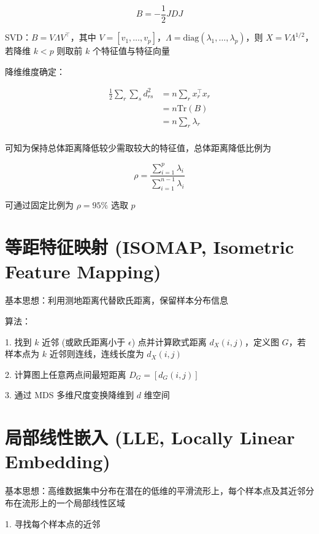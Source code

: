 \documentclass[openany,a4paper,12pt]{ctexbook}
\theoremstyle{kaiti}
\theoremstyle{normal}
\begin{document}
\begin{equation}
B=-\frac{1}{2}JDJ
\end{equation}

SVD：$B=V\Lambda V^{\top}$，其中 $V=\left[v_1,\dots ,v_p \right]$，$\Lambda =\mathrm{diag}\left(\lambda_1,\dots ,\lambda_p \right)$，则 $X=V\Lambda ^{1/2}$，若降维 $k < p$ 则取前 $k$ 个特征值与特征向量

降维维度确定：

\begin{equation}
\begin{aligned}
  \frac{1}{2}\sum_r\sum_sd_{rs}^{2}
  &=n\sum_rx_{r}^{\top}x_r\\
  &=n\mathrm{Tr}\left(B \right)\\
  &=n\sum_r\lambda_r\\
\end{aligned}
\end{equation}

可知为保持总体距离降低较少需取较大的特征值，总体距离降低比例为 

\begin{equation}
\rho=\frac{\displaystyle\sum_{i=1}^{p}\lambda_i}{\displaystyle\sum_{i=1}^{n-1}\lambda_i}
\end{equation}

可通过固定比例为 $\rho=95\%$ 选取 $p$

\section{等距特征映射 (ISOMAP, Isometric Feature Mapping) }

基本思想：利用测地距离代替欧氏距离，保留样本分布信息

算法：

1. 找到 $k$ 近邻 (或欧氏距离小于 $\epsilon$) 点并计算欧式距离 $d_X\left(i,j \right)$，定义图 $G$，若样本点为 $k$ 近邻则连线，连线长度为 $d_X\left(i,j \right)$

2. 计算图上任意两点间最短距离 $D_G=\left[d_G\left(i,j \right)\right]$

3. 通过 MDS 多维尺度变换降维到 $d$ 维空间

\section{局部线性嵌入 (LLE, Locally Linear Embedding) }

基本思想：高维数据集中分布在潜在的低维的平滑流形上，每个样本点及其近邻分布在流形上的一个局部线性区域

1. 寻找每个样本点的近邻
\end{document}
